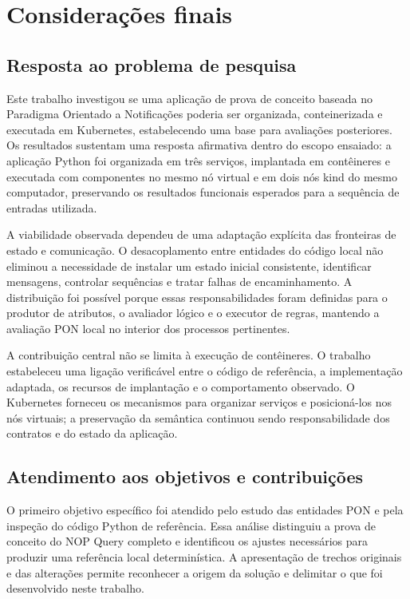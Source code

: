 \chapter{Considerações finais}
\label{cap:conclusoeseperspectivas}

\section{Resposta ao problema de pesquisa}

Este trabalho investigou se uma aplicação de prova de conceito baseada no Paradigma Orientado a Notificações poderia ser organizada, conteinerizada e executada em Kubernetes, estabelecendo uma base para avaliações posteriores. Os resultados sustentam uma resposta afirmativa dentro do escopo ensaiado: a aplicação Python foi organizada em três serviços, implantada em contêineres e executada com componentes no mesmo nó virtual e em dois nós kind do mesmo computador, preservando os resultados funcionais esperados para a sequência de entradas utilizada.

A viabilidade observada dependeu de uma adaptação explícita das fronteiras de estado e comunicação. O desacoplamento entre entidades do código local não eliminou a necessidade de instalar um estado inicial consistente, identificar mensagens, controlar sequências e tratar falhas de encaminhamento. A distribuição foi possível porque essas responsabilidades foram definidas para o produtor de atributos, o avaliador lógico e o executor de regras, mantendo a avaliação PON local no interior dos processos pertinentes.

A contribuição central não se limita à execução de contêineres. O trabalho estabeleceu uma ligação verificável entre o código de referência, a implementação adaptada, os recursos de implantação e o comportamento observado. O Kubernetes forneceu os mecanismos para organizar serviços e posicioná-los nos nós virtuais; a preservação da semântica continuou sendo responsabilidade dos contratos e do estado da aplicação.

\section{Atendimento aos objetivos e contribuições}

O primeiro objetivo específico foi atendido pelo estudo das entidades PON e pela inspeção do código Python de referência. Essa análise distinguiu a prova de conceito do NOP Query completo e identificou os ajustes necessários para produzir uma referência local determinística. A apresentação de trechos originais e das alterações permite reconhecer a origem da solução e delimitar o que foi desenvolvido neste trabalho.

